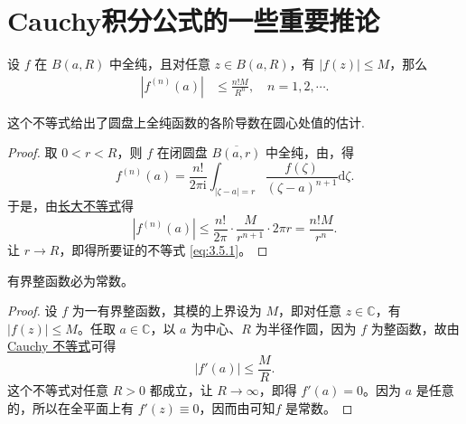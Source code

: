 \documentclass[../../main.tex]{subfiles}
\begin{document}
\section{Cauchy积分公式的一些重要推论}

\begin{theorem}[Cauchy不等式]\label{theorem:Cauchy不等式-复变函数}
设 \( f \) 在 \( B(a,R) \) 中全纯，且对任意 \( z \in B(a,R) \)，有 \( |f(z)| \leqslant M \)，那么
\begin{align}
|f^{(n)}(a)| &\leqslant \frac{n!M}{R^n}, \quad n = 1,2,\cdots. \label{eq:3.5.1}
\end{align}
\end{theorem}
\begin{note}
这个不等式给出了圆盘上全纯函数的各阶导数在圆心处值的估计.
\end{note}
\begin{proof}
取 \( 0 < r < R \)，则 \( f \) 在闭圆盘 \( \overline{B(a,r)} \) 中全纯，由，得
\[
f^{(n)}(a) = \frac{n!}{2\pi \mathrm{i}} \int_{|\zeta - a| = r} \frac{f(\zeta)}{(\zeta - a)^{n + 1}} \mathrm{d}\zeta.
\]
于是，由\hyperref[proposition:长大不等式]{长大不等式}得
\[
|f^{(n)}(a)| \leqslant \frac{n!}{2\pi} \cdot \frac{M}{r^{n + 1}} \cdot 2\pi r = \frac{n!M}{r^n}.
\]
让 \( r \to R \)，即得所要证的不等式 \eqref{eq:3.5.1}。

\end{proof}

\begin{theorem}[Liouville定理]\label{theorem:Liouville(刘维尔)定理}
有界整函数必为常数。
\end{theorem}
\begin{proof}
设 \( f \) 为一有界整函数，其模的上界设为 \( M \)，即对任意 \( z \in \mathbb{C} \)，有 \( |f(z)| \leqslant M \)。任取 \( a \in \mathbb{C} \)，以 \( a \) 为中心、\( R \) 为半径作圆，因为 \( f \) 为整函数，故由 \hyperref[theorem:Cauchy不等式-复变函数]{Cauchy 不等式}可得
\[
|f'(a)| \leqslant \frac{M}{R}.
\]
这个不等式对任意 \( R > 0 \) 都成立，让 \( R \to \infty \)，即得 \( f'(a) = 0 \)。因为 \( a \) 是任意的，所以在全平面上有 \( f'(z) \equiv 0 \)，因而由可知\( f \) 是常数。

\end{proof}
\end{document}

